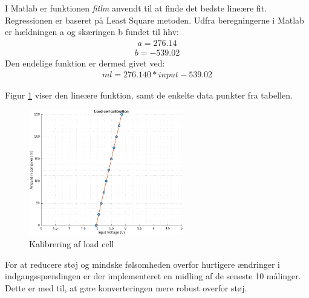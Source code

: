 I Matlab er funktionen \textit{fitlm} anvendt til at finde det bedste lineære fit. Regressionen er baseret på Least Square metoden. 
Udfra beregningerne i Matlab er hældningen a og skæringen b fundet til hhv:
\begin{align}
a = 276.14
\end{align}
\begin{align}
b = -539.02
\end{align}
Den endelige funktion er dermed givet ved:
\begin{align}
ml = 276.140*input-539.02
\end{align}

Figur \ref{fig:loadcellcalib} viser den lineære funktion, samt de enkelte data punkter fra tabellen. 
\begin{figure}[H]
	\centering
	\includegraphics[width=0.6\textwidth]{billeder/software/calibration-crop.pdf}
	\caption{Kalibrering af load cell}
	\label{fig:loadcellcalib}
\end{figure}

For at reducere støj og mindske følsomheden overfor hurtigere ændringer i indgangsspændingen er der implementeret en midling af de seneste 10 målinger. Dette er med til, at gøre konverteringen mere robust overfor støj.  

\newpage
